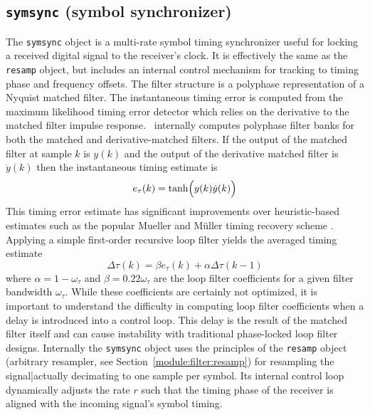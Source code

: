 \subsection{{\tt symsync} (symbol synchronizer)}
\label{module:filter:symsync}
The {\tt symsync} object is a multi-rate symbol timing synchronizer
useful for locking a received digital signal to the receiver's clock.
It is effectively the same as the {\tt resamp} object, but includes an
internal control mechanism for tracking to timing phase and frequency
offsets.
The filter structure is a polyphase representation of a Nyquist matched
filter.
%
The instantaneous timing error is computed from the maximum likelihood
timing error detector \cite{Mengali:1997} which relies on the derivative
to the matched filter impulse response.
\liquid\ internally computes polyphase filter banks for both the
matched and derivative-matched filters.
If the output of the matched filter at sample $k$ is $y(k)$
and the output of the derivative matched filter is $\dot{y}(k)$
then the instantaneous timing estimate is
%
\begin{equation}
\label{eqn:filter:symsync:timing_error}
    e_\tau(k) = \tanh\Bigl( y(k)\dot{y}(k) \Bigr)
\end{equation}
%
This timing error estimate has significant improvements over
heuristic-based estimates such as the popular Mueller and M\"{u}ller
timing recovery scheme \cite{Mueller:1976}. %
Applying a simple first-order recursive loop filter yields the averaged
timing estimate
%
\begin{equation}
\label{eqn:filter:symsync:timing_error_filtered}
    \Delta\tau(k) = \beta e_\tau(k) + \alpha\Delta\tau(k-1)
\end{equation}
%
where
$\alpha = 1-\omega_\tau$ and $\beta = 0.22\omega_\tau$
are the loop filter coefficients for a given filter bandwidth
$\omega_\tau$.
While these coefficients are certainly not optimized,
it is important to understand the difficulty in computing loop filter
coefficients when a delay is introduced into a control loop.
This delay is the result of the matched filter itself and can cause
instability with traditional phase-locked loop filter designs.
%
Internally the {\tt symsync} object uses the principles of the
{\tt resamp} object
(arbitrary resampler, see Section~\ref{module:filter:resamp})
for resampling the signal|actually decimating to one sample per symbol.
Its internal control loop dynamically adjusts the rate $r$ such that
the timing phase of the receiver is aligned with the incoming signal's
symbol timing.

